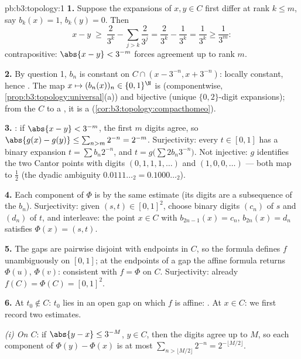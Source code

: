\begin{solution}{pb:b3:topology:1}
\textbf{1.} Suppose the expansions of $x, y \in C$ first differ
at rank $k \leq m$, say $b_k(x) = 1$, $b_k(y) = 0$. Then
\[
x - y \;\geq\; \frac{2}{3^k} - \sum_{j > k}\frac{2}{3^j}
= \frac{2}{3^k} - \frac{1}{3^k} = \frac1{3^k} \geq \frac1{3^m}:
\]
contrapositive: $\abs{x - y} < 3^{-m}$ forces agreement up to
rank $m$.

\textbf{2.} By question 1, $b_n$ is constant on $C \cap (x -
3^{-n}, x + 3^{-n})$: locally constant, hence . The
map $x \mapsto (b_n(x))_n \in \{0,1\}^\N$ is 
(componentwise, \cref{prop:b3:topology:universal}(a)) and
bijective (unique $\{0,2\}$-digit expansions); from the 
$C$ to a , it is a 
(\cref{cor:b3:topology:compacthomeo}).

\textbf{3.} : if $\abs{x - y} < 3^{-m}$, the first
$m$ digits agree, so $\abs{g(x) - g(y)} \leq \sum_{n > m}2^{-n}
= 2^{-m}$. Surjectivity: every $t \in [0,1]$ has a binary
expansion $t = \sum b_n2^{-n}$, and $t = g\bigl(\sum
2b_n3^{-n}\bigr)$. Not injective: $g$ identifies the two Cantor
points with digits $(0,1,1,1,\dots)$ and $(1,0,0,\dots)$ ---
both map to $\frac12$ (the dyadic ambiguity $0.0111\ldots_2 =
0.1000\ldots_2$).

\textbf{4.} Each component of $\Phi$ is  by the same
estimate (its digits are a subsequence of the $b_n$).
Surjectivity: given $(s, t) \in [0,1]^2$, choose binary digits
$(c_n)$ of $s$ and $(d_n)$ of $t$, and interleave: the point $x
\in C$ with $b_{2n-1}(x) = c_n$, $b_{2n}(x) = d_n$ satisfies
$\Phi(x) = (s,t)$.

\textbf{5.} The gaps are pairwise disjoint with endpoints in
$C$, so the formula defines $f$ unambiguously on $[0,1]$; at
the endpoints of a gap the affine formula returns $\Phi(u)$,
$\Phi(v)$: consistent with $f = \Phi$ on $C$. Surjectivity:
already $f(C) = \Phi(C) = [0,1]^2$.

\textbf{6.} At $t_0 \notin C$: $t_0$ lies in an open gap on
which $f$ is affine: . At $x \in C$: we first record
two estimates.

\emph{(i) On $C$}: if $\abs{y - x} \leq 3^{-M}$, $y \in C$,
then the digits agree up to $M$, so each component of $\Phi(y)
- \Phi(x)$ is at most $\sum_{n > \lfloor M/2\rfloor} 2^{-n} =
2^{-\lfloor M/2\rfloor}$.


\end{solution}
